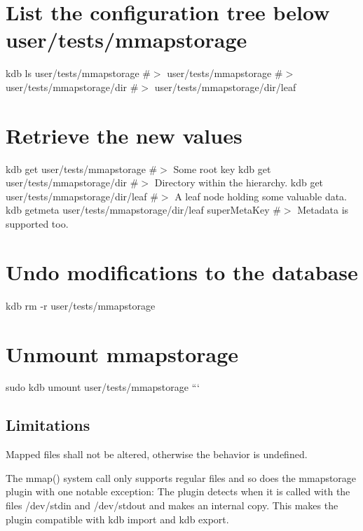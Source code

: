 \section*{List the configuration tree below {\ttfamily user/tests/mmapstorage}}

kdb ls user/tests/mmapstorage \#$>$ user/tests/mmapstorage \#$>$ user/tests/mmapstorage/dir \#$>$ user/tests/mmapstorage/dir/leaf

\section*{Retrieve the new values}

kdb get user/tests/mmapstorage \#$>$ Some root key kdb get user/tests/mmapstorage/dir \#$>$ Directory within the hierarchy. kdb get user/tests/mmapstorage/dir/leaf \#$>$ A leaf node holding some valuable data. kdb getmeta user/tests/mmapstorage/dir/leaf super\+Meta\+Key \#$>$ Metadata is supported too.

\section*{Undo modifications to the database}

kdb rm -\/r user/tests/mmapstorage

\section*{Unmount mmapstorage}

sudo kdb umount user/tests/mmapstorage ```

\subsection*{Limitations}

Mapped files shall not be altered, otherwise the behavior is undefined.

The {\ttfamily mmap()} system call only supports regular files and so does the mmapstorage plugin with one notable exception\+: The plugin detects when it is called with the files {\ttfamily /dev/stdin} and {\ttfamily /dev/stdout} and makes an internal copy. This makes the plugin compatible with {\ttfamily kdb import} and {\ttfamily kdb export}. 